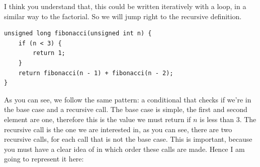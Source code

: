 \documentclass[a4paper]{article}
\begin{document}
I think you understand that, this could be written iteratively with a loop, in
a similar way to the factorial. So we will jump right to the recursive
definition.

\noindent
\begin{minipage}[H]{\linewidth}
\mbox{}
\begin{lstlisting}[style=C, caption={Function to calculate Fibonacci succession},
label={lst:funFibonacci}]
unsigned long fibonacci(unsigned int n) {
    if (n < 3) {
        return 1;
    }
    return fibonacci(n - 1) + fibonacci(n - 2);
}
\end{lstlisting}
\end{minipage}

As you can see, we follow the same pattern: a conditional that checks if we're
in the base case and a recursive call. The base case is simple, the first and
second element are one, therefore this is the value we must return if $n$ is
less than 3. The recursive call is the one we are interested in, as you can see,
there are two recursive calls, for each call that is not the base case. This is
important, because you must have a clear idea of in which order these calls are
made. Hence I am going to represent it here:
\end{document}
